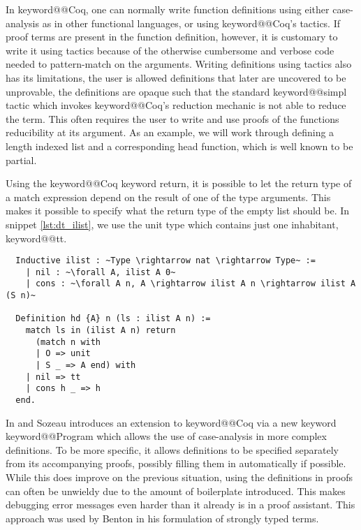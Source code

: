 \documentclass[12pt, final]{article}
\makeatletter
\def\<#1>{\csname keyword@@#1\endcsname}
\makeatother
\begin{document}
In \<Coq>, one can normally write function definitions using either case-analysis as in other functional languages, or using \<Coq>'s tactics.
If proof terms are present in the function definition, however, it is customary to write it using tactics because of the otherwise cumbersome and verbose code needed to pattern-match on the arguments.
Writing definitions using tactics also has its limitations, the user is allowed definitions that later are uncovered to be unprovable, the definitions are opaque such that the standard \<simpl> tactic which invokes \<Coq>'s reduction mechanic is not able to reduce the term.
This often requires the user to write and use proofs of the functions reducibility at its argument.
As an example, we will work through defining a length indexed list and a corresponding head function, which is well known to be partial.

Using the \<Coq> keyword return, it is possible to let the return type of a match expression depend on the result of one of the type arguments.
This makes it possible to specify what the return type of the empty list should be.
In snippet \ref{lst:dt_ilist}, we use the unit type which contains just one inhabitant, \<tt>.

\begin{listing}
  \begin{verbatim}
  Inductive ilist : ~Type \rightarrow nat \rightarrow Type~ :=
    | nil : ~\forall A, ilist A 0~
    | cons : ~\forall A n, A \rightarrow ilist A n \rightarrow ilist A (S n)~

  Definition hd {A} n (ls : ilist A n) :=
    match ls in (ilist A n) return
      (match n with
      | O => unit
      | S _ => A end) with
    | nil => tt
    | cons h _ => h
  end.
  \end{verbatim}
  \caption{Definition of a length indexed list and hd using the return keyword, adapted from \cite{ChlipalaCPDT}.}
  \label{lst:dt_ilist}
\end{listing}

In \cite{Sozeau2006} and \cite{Sozeau2007} Sozeau introduces an extension to \<Coq> via a new keyword \<Program> which allows the use of case-analysis in more complex definitions.
To be more specific, it allows definitions to be specified separately from its accompanying proofs, possibly filling them in automatically if possible.
While this does improve on the previous situation, using the definitions in proofs can often be unwieldy due to the amount of boilerplate introduced.
This makes debugging error messages even harder than it already is in a proof assistant. This approach was used by Benton in his formulation of strongly typed terms.
\end{document}
